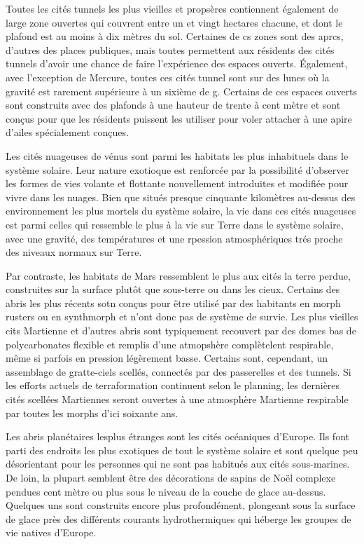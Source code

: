                Toutes les cités tunnels les plus vieilles et propsères contiennent également de large zone ouvertes qui couvrent entre un et vingt hectares chacune, et dont le plafond est au moins à dix mètres du sol. Certaines de cs zones sont des aprcs, d'autres des places publiques, mais toutes permettent aux résidents des cités tunnels d'avoir une chance de faire l'expérience des espaces ouverts. Également, avec l'exception de Mercure, toutes ces cités tunnel sont sur des lunes où la gravité est rarement supérieure à un sixième de g. Certains de ces espaces ouverts sont construits avec des plafonds à une hauteur de trente à cent mètre et sont conçus pour que les résidents puissent les utiliser pour voler attacher à une apire d'ailes spécialement conçues. 

               Les cités nuageuses de vénus sont parmi les habitats les plus inhabituels dans le système solaire. Leur nature exotioque est renforcée par la possibilité d'observer les formes de vies volante et flottante nouvellement introduites et modifiée pour vivre dans les nuages. Bien que situés presque cinquante kilomètres au-dessus des environnement les plus mortels du système solaire, la vie dans ces cités nuageuses est parmi celles qui ressemble le plus à la vie sur Terre  dans le système solaire, avec une gravité, des températures et une rpession atmosphériques trés proche des niveaux normaux sur Terre. 

               Par contraste, les habitats de Mars ressemblent le plus aux cités la terre perdue, construites sur la surface plutôt que sous-terre ou dans les cieux. Certains des abris les plus récents sotn conçus pour être utilisé par des habitants en morph rusters ou en synthmorph et n'ont donc pas de système de survie. Les plus vieilles cits Martienne et d'autres abris sont typiquement recouvert par des domes bas de polycarbonates flexible et remplis d'une atmopshère complètelent respirable, même si parfois en pression légèrement basse. Certains sont, cependant, un assemblage de gratte-ciels scellés, connectés par des passerelles et des tunnels. Si les efforts actuels de terraformation continuent selon le planning, les dernières cités scellées Martiennes seront ouvertes à une atmosphère Martienne respirable par toutes les morphs d'ici soixante ans. 

               Les abris planétaires lesplus étranges sont les cités océaniques d'Europe. Ils font parti des endroits les plus exotiques de tout le système solaire et sont quelque peu désorientant pour les personnes qui ne sont pas habitués aux cités sous-marines. De loin, la plupart semblent être des décorations de sapins de Noël complexe pendues cent mètre ou plus sous le niveau de la couche de glace au-dessus. Quelques uns sont construits encore plus profondément, plongeant sous la surface de glace près des différents courants hydrothermiques qui héberge les groupes de vie natives d'Europe. 

